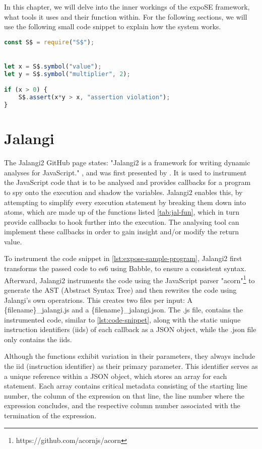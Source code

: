 In this chapter, we will delve into the inner workings of the expoSE framework, what tools it uses and their function within. 
For the following sections, we will use the following small code snippet to explain how the system works. 


\begin{lstlisting}[language=JavaScript, float, floatplacement=tbp, caption={A simple program for ExpoSE}, label={lst:expose-sample-program}]
const S$ = require("S$");


let x = S$.symbol("value"); 
let y = S$.symbol("multiplier", 2);

if (x > 0) {
    S$.assert(x*y > x, "assertion violation"); 
}


\end{lstlisting}




\section{Jalangi}
\label{sec:jalangi}
The Jalangi2 GitHub page \cite{noauthor_samsungjalangi2_nodate} states: "Jalangi2 is a framework for writing dynamic analyses for JavaScript." , and was first presented by \citet{sen_jalangi_2013}. It is used to instrument the JavaScript code that is to be analysed and provides callbacks for a program to spy onto the execution and shadow the variables.
Jalangi2 enables this, by attempting to simplify every execution statement by breaking them down into atoms, which are made up of the functions listed \autoref{tab:jal-fun}, which in turn provide callbacks to hook further into the execution.
The analysing tool can implement these callbacks in order to gain insight and/or modify the return value.


To instrument the code snippet in \autoref{lst:expose-sample-program}, Jalangi2 first transforms the passed code to es6 using Babble, to ensure a consistent syntax. 
Afterward, Jalangi2 instruments the code using the JavaScript parser "acorn"\footnote{https://github.com/acornjs/acorn} to generate the AST (Abstract Syntax Tree) and then rewrites the code using Jalangi's own operatrions. This creates two files per input: 
A \{filename\}\_jalangi.js and a \{filename\}\_jalangi.json. The .js file, contains the instrumented code, similar to \autoref{lst:code-snippet}, along with the static unique instruction identifiers (iids) of each callback as a JSON object, while the .json file only contains the iids.

Although the functions exhibit variation in their parameters, they always include the iid (instruction identifier) as their primary parameter. This identifier serves as a unique reference within a JSON object, which stores an array for each statement. Each array contains critical metadata consisting of the starting line number, the column of the expression on that line, the line number where the expression concludes, and the respective column number associated with the termination of the expression.



